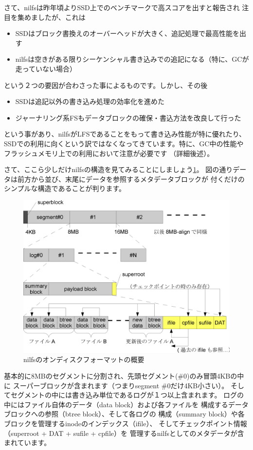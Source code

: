 \documentclass[mingoth,a4paper]{jsarticle}
\begin{document}
さて、nilfsは昨年頃よりSSD上でのベンチマークで高スコアを出すと報告され
注目を集めましたが、これは
\begin{itemize}
\item SSDはブロック書換えのオーバーヘッドが大きく、追記処理で最高性能を出す
\item nilfsは空きがある限りシーケンシャル書き込みでの追記になる（特に、GCが走っていない場合）
\end{itemize}
という２つの要因が合わさった事によるものです。しかし、その後
\begin{itemize}
\item SSDは追記以外の書き込み処理の効率化を進めた
\item ジャーナリング系FSもデータブロックの確保・書込方法を改良して行った
\end{itemize}
という事があり、nilfsがLFSであることをもって書き込み性能が特に優れたり、
SSDでの利用に向くという訳ではなくなってきています。特に、GC中の性能や
フラッシュメモリ上での利用において注意が必要です\cite{nilperf,nilssd}
（詳細後述）。

さて、ここら少しだけnilfsの構造を見てみることにしましょう\ref{nilfmt}。
図の通りデータは前方から並び、末尾にデータを参照するメタデータブロックが
付くだけのシンプルな構造であることが判ります。

\begin{figure}
\begin{center}
\includegraphics[width=0.8\hsize]{image201011/nilfs-graphics-001.eps}
\caption{nilfsのオンディスクフォーマットの概要}
\label{nilfmt}
\end{center}
\end{figure}

基本的に8MBのセグメントに分割され、先頭セグメント(\#0)のみ冒頭4KBの中に
スーパーブロックが含まれます（つまりsegment \#0だけ4KB小さい）。
そしてセグメントの中には書き込み単位であるログが１つ以上含まれます。
ログの中にはファイル自体のデータ（data block）および各ファイルを
構成するデータブロックへの参照（btree block）、そして各ログの
構成（summary block）や各ブロックを管理するinodeのインデックス（ifile）、
そしてチェックポイント情報（superroot + DAT + sufile + cpfile）を
管理するnilfsとしてのメタデータが含まれています\cite{niltxt,niljls09}。
\end{document}
